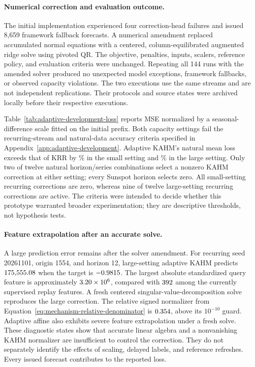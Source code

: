 \paragraph{Numerical correction and evaluation outcome.}
The initial implementation experienced four correction-head failures
and issued 8,659 framework fallback forecasts. A numerical amendment
replaced accumulated normal equations with a centered, column-equilibrated
augmented ridge solve using pivoted QR. The objective, penalties, inputs,
scalers, reference policy, and evaluation criteria were unchanged.
Repeating all 144 runs with the amended solver produced no unexpected
model exceptions, framework fallbacks, or observed capacity violations.
The two executions use the same streams and are not independent
replications. Their protocols and source states were archived locally
before their respective executions.



Table~\ref{tab:adaptive-development-loss} reports MSE normalized by a
seasonal-difference scale fitted on the initial prefix. Both capacity
settings fail the recurring-stream and natural-data accuracy criteria
specified in Appendix~\ref{app:adaptive-development}. Adaptive KAHM's
natural mean loss exceeds that of KRR by \ADSmallKRRExcess\% in the
small setting and \ADLargeKRRExcess\% in the large setting. Only two
of twelve natural horizon/series combinations select a nonzero KAHM
correction at either setting; every Sunspot horizon selects zero.
All small-setting recurring corrections are zero, whereas nine of
twelve large-setting recurring corrections are active. The criteria
were intended to decide whether this prototype warranted broader
experimentation; they are descriptive thresholds, not hypothesis tests.

\paragraph{Feature extrapolation after an accurate solve.}
A large prediction error remains after the solver amendment. For
recurring seed 20261101, origin 1554, and horizon 12, large-setting
adaptive KAHM predicts $175{,}555.08$ when the target is
$-0.9815$. The largest absolute standardized query feature is
approximately $3.20\times10^6$, compared with
$392$ among the currently supervised replay
features. A fresh centered singular-value-decomposition solve reproduces
the large correction. The relative signed normalizer from
Equation~\eqref{eq:mechanism-relative-denominator} is
$0.354$, above its $10^{-10}$ guard. Adaptive affine
also exhibits severe feature extrapolation under a fresh solve.
These diagnostic states show that accurate linear algebra and a
nonvanishing KAHM normalizer are insufficient to control the correction.
They do not separately identify the effects of scaling, delayed labels,
and reference refreshes. Every issued forecast contributes to the
reported loss.

